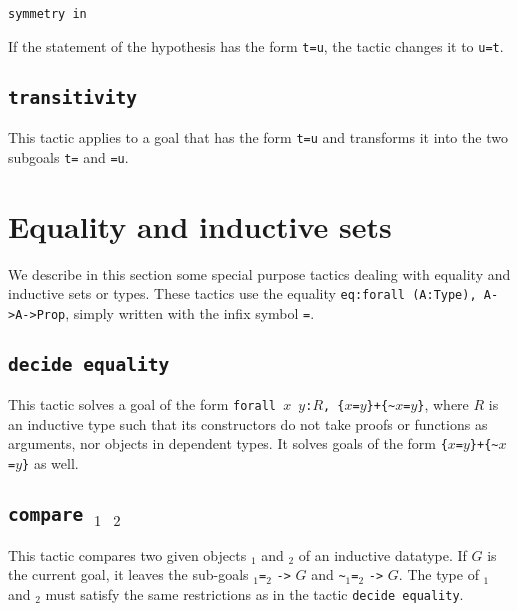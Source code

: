 \begin{coq_example*}
\begin{Variants}
\item {\tt symmetry in \ident} 

If the statement of the hypothesis {\ident} has the form {\tt t=u},
the tactic changes it to {\tt u=t}.
\end{Variants}

\subsection{\tt transitivity \term}

This tactic applies to a goal that has the form {\tt t=u}
and transforms it into the two subgoals
{\tt t={\term}} and {\tt {\term}=u}.

\section{Equality and inductive sets}

We describe in this section some special purpose tactics dealing with
equality and inductive sets or types. These tactics use the equality
{\tt eq:forall (A:Type), A->A->Prop}, simply written with the
infix symbol {\tt =}.

\subsection{\tt decide equality}
\label{decideequality}

This tactic solves a goal of the form
{\tt forall $x$ $y$:$R$, \{$x$=$y$\}+\{\verb|~|$x$=$y$\}}, where $R$
is an inductive type such that its constructors do not take proofs or
functions as arguments, nor objects in dependent types.
It solves goals of the form {\tt \{$x$=$y$\}+\{\verb|~|$x$=$y$\}} as well.

\subsection{\tt compare \term$_1$ \term$_2$}

This tactic compares two given objects \term$_1$ and \term$_2$
of an inductive datatype. If $G$ is the current goal, it leaves the sub-goals
\term$_1${\tt =}\term$_2$ {\tt ->} $G$ and \verb|~|\term$_1${\tt =}\term$_2$
{\tt ->} $G$. The type
of \term$_1$ and \term$_2$ must satisfy the same restrictions as in the tactic
\texttt{decide equality}.


\end{coq_example*}
